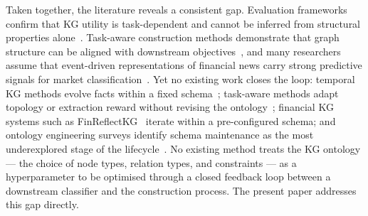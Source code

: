 Taken together, the literature reveals a consistent gap.
Evaluation frameworks confirm that KG utility is task-dependent and cannot be inferred
from structural properties alone~\citep{heist2023kgreat, bloem2021kgbench}.
Task-aware construction methods demonstrate that graph structure can be aligned with
downstream objectives~\citep{cucumides2025augraph, tsang2025autographr1}, and
many researchers assume that event-driven representations of financial news carry
strong predictive signals for market classification~\citep{ding2015stock, ding2016kgeventstock,
hu2018chaoticwhispers, xu2018stocktweets}.
Yet no existing work closes the loop: temporal KG methods evolve facts within a fixed
schema~\citep{trivedi2017knowevolve}; task-aware methods adapt topology or extraction reward
without revising the ontology~\citep{cucumides2025augraph, tsang2025autographr1};
financial KG systems such as FinReflectKG~\citep{arun2025finreflectkg} iterate within a
pre-configured schema; and ontology engineering surveys identify schema maintenance as the
most underexplored stage of the lifecycle~\citep{li2025llmontologyreview}.
No existing method treats the KG ontology --- the choice of node types, relation types,
and constraints --- as a hyperparameter to be optimised through a closed feedback loop
between a downstream classifier and the construction process.
The present paper addresses this gap directly.